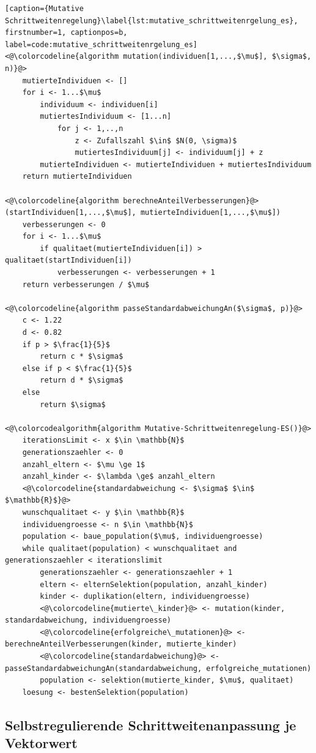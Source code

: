 \begin{lstlisting}[caption={Mutative Schrittweitenregelung}\label{lst:mutative_schrittweitenrgelung_es}, firstnumber=1, captionpos=b, label=code:mutative_schrittweitenrgelung_es]
<@\colorcodeline{algorithm mutation(individuen[1,...,$\mu$], $\sigma$, n)}@>
	mutierteIndividuen <- []
	for i <- 1...$\mu$
		individuum <- individuen[i]
		mutiertesIndividuum <- [1...n]		
			for j <- 1,..,n
				z <- Zufallszahl $\in$ $N(0, \sigma)$
				mutiertesIndividuum[j] <- individuum[j] + z
		mutierteIndividuen <- mutierteIndividuen + mutiertesIndividuum
	return mutierteIndividuen
	
<@\colorcodeline{algorithm berechneAnteilVerbesserungen}@>(startIndividuen[1,...,$\mu$], mutierteIndividuen[1,...,$\mu$])
	verbesserungen <- 0	
	for i <- 1...$\mu$
		if qualitaet(mutierteIndividuen[i]) > qualitaet(startIndividuen[i])
			verbesserungen <- verbesserungen + 1
	return verbesserungen / $\mu$
	
<@\colorcodeline{algorithm passeStandardabweichungAn($\sigma$, p)}@>
	c <- 1.22
	d <- 0.82
	if p > $\frac{1}{5}$
		return c * $\sigma$
	else if p < $\frac{1}{5}$
		return d * $\sigma$
	else
		return $\sigma$

<@\colorcodealgorithm{algorithm Mutative-Schrittweitenregelung-ES()}@>
	iterationsLimit <- x $\in \mathbb{N}$
	generationszaehler <- 0
	anzahl_eltern <- $\mu \ge 1$
	anzahl_kinder <- $\lambda \ge$ anzahl_eltern
	<@\colorcodeline{standardabweichung <- $\sigma$ $\in$ $\mathbb{R}$}@>
	wunschqualitaet <- y $\in \mathbb{R}$
	individuengroesse <- n $\in \mathbb{N}$
	population <- baue_population($\mu$, individuengroesse)
	while qualitaet(population) < wunschqualitaet and generationszaehler < iterationslimit
		generationszaehler <- generationszaehler + 1
		eltern <- elternSelektion(population, anzahl_kinder)
		kinder <- duplikation(eltern, individuengroesse)
		<@\colorcodeline{mutierte\_kinder}@> <- mutation(kinder, standardabweichung, individuengroesse)
		<@\colorcodeline{erfolgreiche\_mutationen}@> <- berechneAnteilVerbesserungen(kinder, mutierte_kinder)
		<@\colorcodeline{standardabweichung}@> <- passeStandardabweichungAn(standardabweichung, erfolgreiche_mutationen)
		population <- selektion(mutierte_kinder, $\mu$, qualitaet)
	loesung <- bestenSelektion(population)
\end{lstlisting}

\subsection{Selbstregulierende Schrittweitenanpassung je Vektorwert}

